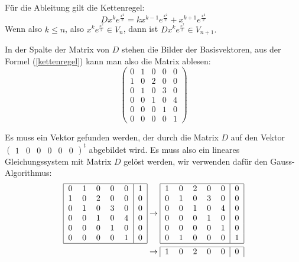 \begin{loesung}
\begin{teilaufgaben}
\item Für die Ableitung gilt die Kettenregel:
\begin{equation}
Dx^ke^{\frac{x^2}2}=kx^{k-1}e^{\frac{x^2}2}+x^{k+1}e^{\frac{x^2}2}
\label{kettenregel}
\end{equation}
Wenn also $k\le n$, also $x^ke^{\frac{x^2}2}\in V_n$, dann ist
$Dx^ke^{\frac{x^2}2}\in V_{n+1}.$
\item
In der Spalte der Matrix von $D$ stehen die Bilder der Basisvektoren,
aus der Formel (\ref{kettenregel}) kann man also die Matrix ablesen:
\[
\begin{pmatrix}
0&1&0&0&0\\
1&0&2&0&0\\
0&1&0&3&0\\
0&0&1&0&4\\
0&0&0&1&0\\
0&0&0&0&1
\end{pmatrix}
\]
\item
Es muss ein Vektor gefunden werden, der durch die Matrix $D$ auf
den Vektor $\begin{pmatrix}1&0&0&0&0&0\end{pmatrix}^t$
abgebildet wird. Es muss also ein lineares Gleichungssystem mit
Matrix $D$ gelöst werden, wir verwenden dafür den Gauss-Algorithmus:
\begin{align*}
\begin{tabular}{|ccccc|c|}
\hline
0&1&0&0&0&1\\
1&0&2&0&0&0\\
0&1&0&3&0&0\\
0&0&1&0&4&0\\
0&0&0&1&0&0\\
0&0&0&0&1&0\\
\hline
\end{tabular}
&\rightarrow
\begin{tabular}{|ccccc|c|}
\hline
1&0&2&0&0&0\\
0&1&0&3&0&0\\
0&0&1&0&4&0\\
0&0&0&1&0&0\\
0&0&0&0&1&0\\
0&1&0&0&0&1\\
\hline
\end{tabular}
\\
&\rightarrow
\begin{tabular}{|ccccc|c|}
\hline
1&0&2&0&0&0\\

\end{tabular}
\end{align*}
\end{teilaufgaben}
\end{loesung}
